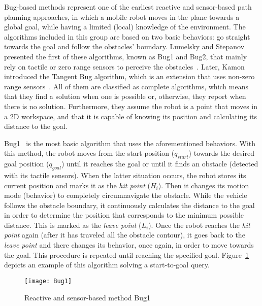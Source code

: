 Bug-based methods represent one of the earliest reactive and sensor-based path
planning approaches, in which a mobile robot moves in the plane towards a global
goal, while having a limited (local) knowledge of the environment. The
algorithms included in this group are based on two basic behaviors: go straight
towards the goal and follow the obstacles' boundary. Lumelsky and Stepanov
presented the first of these algorithms, known as Bug1 and Bug2, that mainly
rely on tactile or zero range sensors to perceive the
obstacles~\cite{Lumelsky1987}. Later, Kamon \etal introduced the Tangent Bug
algorithm, which is an extension that uses non-zero range
sensors~\cite{Kamon1996}. All of them are classified as complete algorithms,
which means that they find a solution when one is possible or, otherwise, they
report when there is no solution. Furthermore, they assume the robot is a point
that moves in a \ac{2D} workspace, and that it is capable of knowing its
position and calculating its distance to the goal.

Bug1~\cite{Lumelsky1987} is the most basic algorithm that uses the
aforementioned behaviors. With this method, the robot moves from the start
position ($q_{start}$) towards the desired goal position ($q_{goal}$) until it
reaches the goal or until it finds an obstacle (detected with its tactile
sensors). When the latter situation occurs, the robot stores its current
position and marks it as the \textit{hit point} ($H_i$). Then it changes its
motion mode (behavior) to completely circumnavigate the obstacle. While the
vehicle follows the obstacle boundary, it continuously calculates the distance
to the goal in order to determine the position that corresponds to the minimum
possible distance. This is marked as the \textit{leave point} ($L_i$). Once the
robot reaches the \textit{hit point} again (\ie after it has traveled all the
obstacle contour), it goes back to the \textit{leave point} and there changes
its behavior, once again, in order to move towards the goal. This procedure is
repeated until reaching the specified goal. Figure~\ref{fig:Bug1} depicts an
example of this algorithm solving a start-to-goal query.

\begin{figure}[htbp]
	\centering
	\texttt{[image: Bug1]} \quad
\caption[Reactive and sensor-based method Bug1.]
{Reactive and sensor-based method Bug1}
\label{fig:Bug1}
\end{figure}

